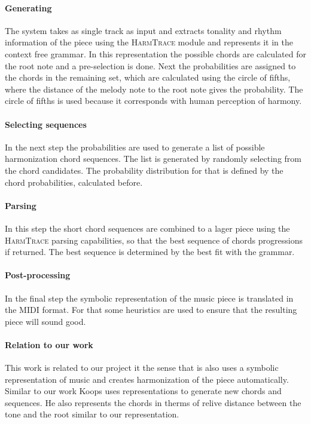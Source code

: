 \paragraph{Generating} 
The system takes as single track as input and extracts tonality and rhythm information of the piece using the \textsc{HarmTrace} module and represents it in the context free grammar. In this representation the possible chords are calculated for the root note and a pre-selection is done. Next the probabilities are assigned to the chords in the remaining set, which are calculated using the circle of fifths, where the distance of the melody note to the root note gives the probability. The circle of fifths is used because it corresponds with human perception of harmony. 

\paragraph{Selecting sequences}
In the next step the probabilities are used to generate a list of possible harmonization chord sequences. The list is generated by randomly selecting from the chord candidates. The probability distribution for that is defined by the chord probabilities, calculated before. 

\paragraph{Parsing}
In this step the short chord sequences are combined to a lager piece using the \textsc{HarmTrace} parsing capabilities, so that the best sequence of chords progressions if returned. The best sequence is determined by the best fit with the grammar.

\paragraph{Post-processing}
In the final step the symbolic representation of the music piece is translated in the MIDI format. For that some heuristics are used to ensure that the resulting piece will sound good. 

\paragraph{Relation to our work}
This work is related to our project it the sense that is also uses a symbolic representation of music and creates harmonization of the piece automatically. Similar to our work Koops uses representations to generate new chords and sequences. He also represents the chords in therms of relive distance between the tone and the root similar to our representation.

